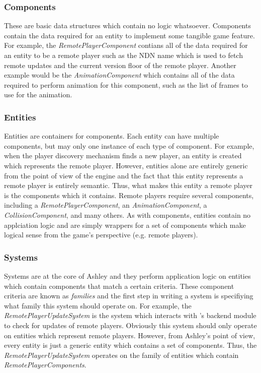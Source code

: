 \subsubsection{Components}
These are basic data structures which contain no logic whatsoever. Components contain the data required for an entity to implement some tangible game feature. For example, the \textit{RemotePlayerComponent} contians all of the data required for an entity to be a remote player such as the NDN name which is used to fetch remote updates and the current version floor of the remote player. Another example would be the \textit{AnimationComponent} which contains all of the data required to perform animation for this component, such as the list of frames to use for the animation. 

\subsubsection{Entities}
Entities are containers for components. Each entity can have multiple components, but may only one instance of each type of component. For example, when the player discovery mechanism finds a new player, an entity is created which represents the remote player. However, entities alone are entirely generic from the point of view of the engine and the fact that this entity represents a remote player is entirely semantic. Thus, what makes this entity a remote player is the components which it contains. Remote players require several components, including a \textit{RemotePlayerComponent}, an \textit{AnimationComponent}, a \textit{CollisionComponent}, and many others. As with components, entities contain no applciation logic and are simply wrappers for a set of components which make logical sense from the game's perspective (e.g. remote players).

\subsubsection{Systems}
Systems are at the core of Ashley and they perform application logic on entities which contain components that match a certain criteria. These component criteria are known as \textit{families} and the first step in writing a system is specifiying what family this system should operate on. For example, the \textit{RemotePlayerUpdateSystem} is the system which interacts with \game{}'s backend module to check for updates of remote players. Obviously this system should only operate on entities which represent remote players. However, from Ashley's point of view, every entity is just a generic entity which contains a set of components. Thus, the \textit{RemotePlayerUpdateSystem} operates on the family of entities which contain \textit{RemotePlayerComponents}. 

